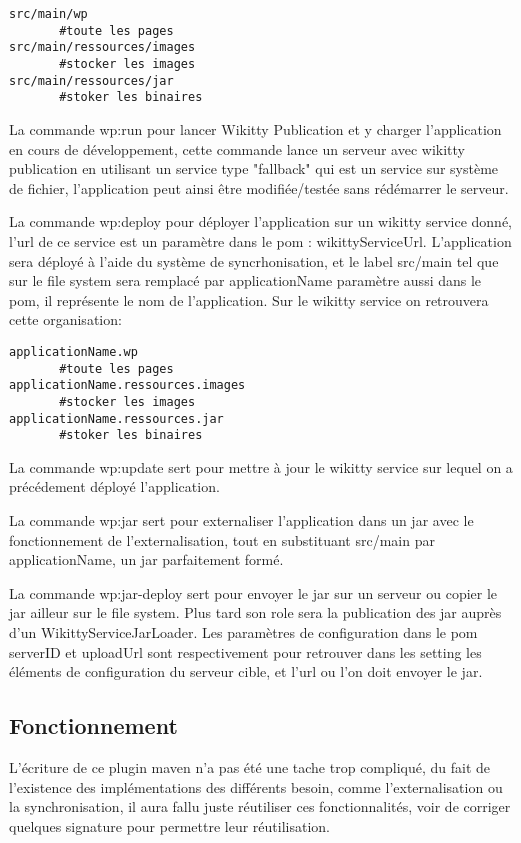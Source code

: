 \begin{verbatim}
src/main/wp
       #toute les pages
src/main/ressources/images
       #stocker les images
src/main/ressources/jar
       #stoker les binaires
\end{verbatim}

La commande wp:run pour lancer Wikitty Publication et y charger l'application
en cours de développement, cette commande lance un serveur avec wikitty publication
en utilisant un service type "fallback" qui est un service sur système de fichier,
l'application peut ainsi être modifiée/testée sans rédémarrer le serveur. 

La commande wp:deploy pour déployer l'application sur un wikitty service donné,
l'url de ce service est un paramètre dans le pom : wikittyServiceUrl. 
L'application sera déployé à l'aide du système de syncrhonisation, et le label
src/main tel que sur le file system sera remplacé par applicationName paramètre
aussi dans le pom, il représente le nom de l'application. Sur le wikitty service
on retrouvera cette organisation:
\begin{verbatim}
applicationName.wp
       #toute les pages
applicationName.ressources.images
       #stocker les images
applicationName.ressources.jar
       #stoker les binaires
\end{verbatim}


La commande wp:update sert pour mettre à jour le wikitty service sur lequel
on a précédement déployé l'application.

La commande wp:jar sert pour externaliser l'application dans un jar avec le
fonctionnement de l'externalisation, tout en substituant src/main par applicationName,
un jar parfaitement formé.

La commande wp:jar-deploy sert pour envoyer le jar sur un serveur ou copier
le jar ailleur sur le file system. Plus tard son role sera la publication 
des jar auprès d'un WikittyServiceJarLoader. Les paramètres de configuration dans
le pom serverID et uploadUrl sont respectivement pour retrouver dans les 
setting les éléments de configuration du serveur cible, et l'url ou l'on 
doit envoyer le jar.


\subsection{Fonctionnement}

L'écriture de ce plugin maven n'a pas été une tache trop compliqué, du fait de 
l'existence des implémentations des différents besoin, comme l'externalisation
ou la synchronisation, il aura fallu juste réutiliser ces fonctionnalités, voir
de corriger quelques signature pour permettre leur réutilisation.

